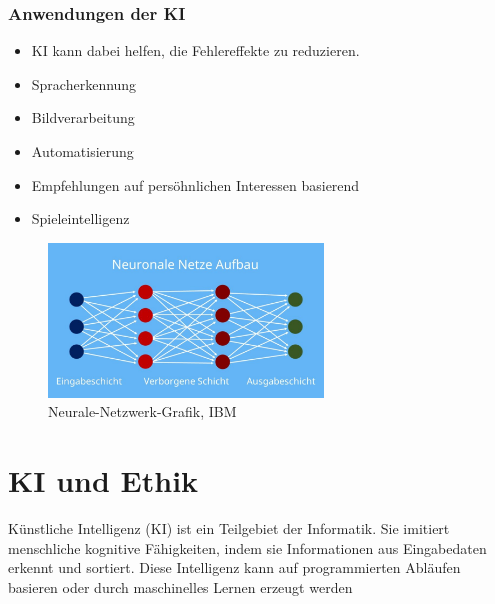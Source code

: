 \documentclass{report}
\begin{document}
\subsection{Anwendungen der KI}
\begin{itemize}
    \item KI kann dabei helfen, die Fehlereffekte zu reduzieren.
    \item Spracherkennung
    \item Bildverarbeitung
    \item Automatisierung
    \item Empfehlungen auf persöhnlichen Interessen basierend
    \item Spieleintelligenz
\end{itemize}
\begin{figure}[h]

    \centering 
 
    \includegraphics[width=0.65\textwidth]{img.jpg} 
 
    \caption{Neurale-Netzwerk-Grafik, IBM}
 
    \label{fig:meme}
 
 \end{figure}
 

\chapter{KI und Ethik}
Künstliche Intelligenz (KI) ist ein Teilgebiet der Informatik. Sie imitiert menschliche kognitive Fähigkeiten, indem sie Informationen aus Eingabedaten erkennt und sortiert. Diese Intelligenz kann auf programmierten Abläufen basieren oder durch maschinelles Lernen erzeugt werden

\printbibliography
\end{document}
